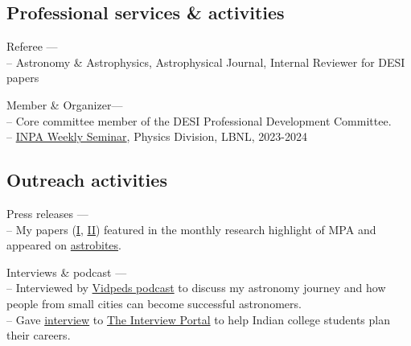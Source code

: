 \documentclass[12pt,letterpaper]{article}
\begin{document}
\vspace{-2mm}
\subsection{Professional services \& activities}

\begin{list}{}{\cvlist}
    \item Referee --- \\
    -- Astronomy \& Astrophysics, Astrophysical Journal, Internal Reviewer for DESI papers
    \item Member \& Organizer--- \\
        -- Core committee member of the DESI Professional Development Committee. \\
        -- \href{https://inpa.lbl.gov/events/}{INPA Weekly Seminar}, Physics Division, LBNL, 2023-2024 \\
        \end{list}
  \vspace{-2mm}
\subsection{Outreach activities}

\begin{list}{}{\cvlist}
    \item Press releases --- \\
        -- My papers (\href{https://www.mpa-garching.mpg.de/964620/hl202107}{I}, \href{https://www.mpa-garching.mpg.de/1066558/hl202211?c=27981}{II}) featured in the monthly research highlight of MPA and appeared on \href{https://astrobites.org/2021/05/06/cool-metal-gas-search-thanks-it-was-automated/}{astrobites}.
    \item Interviews \& podcast --- \\
      -- Interviewed by \href{https://www.youtube.com/watch?v=WmA_PnYLeCg}{Vidpeds podcast} to discuss my astronomy journey and how people from small cities can become successful astronomers. \\
      -- Gave \href{https://theinterviewportal.com/2020/03/13/astrophysicist-interview-8/}{interview} to \href{https://theinterviewportal.com/}{The Interview Portal} to help Indian college students plan their careers.
  \end{list}
\end{document}
